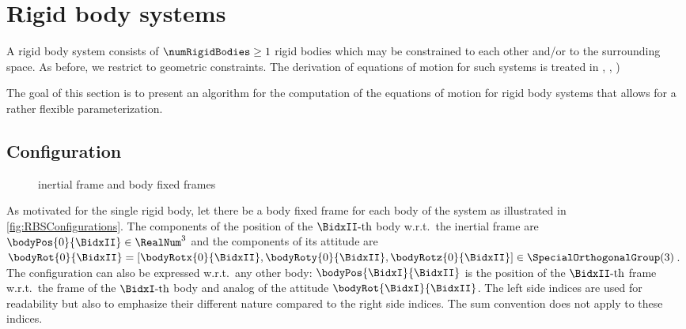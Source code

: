 \section{Rigid body systems}\label{sec:RBSRigidBodySys}
A rigid body system consists of $\numRigidBodies \geq 1$ rigid bodies which may be constrained to each other and/or to the surrounding space.
As before, we restrict to geometric constraints.
The derivation of equations of motion for such systems is treated in \eg \cite{Schwertassek:MultibodySystems}, \cite{Murray:Robotic}, \cite{Kane:Dynamics})

The goal of this section is to present an algorithm for the computation of the equations of motion for rigid body systems that allows for a rather flexible parameterization.

\subsection{Configuration}\label{sec:RBSConfiguration}
\begin{figure}[ht]
 \centering
 
 \caption{inertial frame and body fixed frames}
 \label{fig:RBSConfigurations}
\end{figure}
As motivated for the single rigid body, let there be a body fixed frame for each body of the system as illustrated in \autoref{fig:RBSConfigurations}.
The components of the position of the $\BidxII\text{-th}$ body w.r.t.\ the inertial frame are $\bodyPos{0}{\BidxII} \in \RealNum^3$ and the components of its attitude are $\bodyRot{0}{\BidxII} = [\bodyRotx{0}{\BidxII}, \bodyRoty{0}{\BidxII}, \bodyRotz{0}{\BidxII}] \in \SpecialOrthogonalGroup(3)$.
The configuration can also be expressed w.r.t.\ any other body: $\bodyPos{\BidxI}{\BidxII}$ is the position of the $\BidxII\text{-th}$ frame w.r.t.\ the frame of the $\BidxI\text{-th}$ body and analog of the attitude $\bodyRot{\BidxI}{\BidxII}$.
The left side indices are used for readability but also to emphasize their different nature compared to the right side indices.
The sum convention does not apply to these indices.

